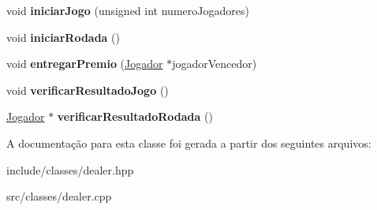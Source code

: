 \begin{DoxyCompactItemize}
void {\bfseries iniciar\+Jogo} (unsigned int numero\+Jogadores)
\item 
\mbox{\label{classpoker_1_1Dealer_a199e2c194dfbfbd5d9b40576adf605ab}} 
void {\bfseries iniciar\+Rodada} ()
\item 
\mbox{\label{classpoker_1_1Dealer_a67523a9bceac961fc213ac76caa48cb5}} 
void {\bfseries entregar\+Premio} (\hyperlink{classpoker_1_1Jogador}{Jogador} $\ast$jogador\+Vencedor)
\item 
\mbox{\label{classpoker_1_1Dealer_accc2bf4aa59ef7b00758f6fd6e7b4104}} 
void {\bfseries verificar\+Resultado\+Jogo} ()
\item 
\mbox{\label{classpoker_1_1Dealer_abc5a130eb4a3f9f5e1dbaaa378039c7b}} 
\hyperlink{classpoker_1_1Jogador}{Jogador} $\ast$ {\bfseries verificar\+Resultado\+Rodada} ()
\end{DoxyCompactItemize}


A documentação para esta classe foi gerada a partir dos seguintes arquivos\+:\begin{DoxyCompactItemize}
\item 
include/classes/dealer.\+hpp\item 
src/classes/dealer.\+cpp\end{DoxyCompactItemize}
